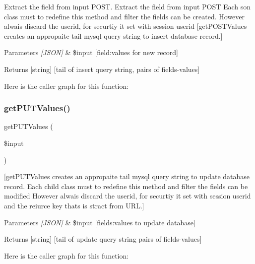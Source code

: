 Extract the field from input P\+O\+ST. Extract the field from input P\+O\+ST Each \textquotesingle{}son\textquotesingle{} class must to redefine this method and filter the fields can be created. However alwais discard the userid, for securtiy it set with session userid \mbox{[}get\+P\+O\+S\+T\+Values creates an appropaite tail mysql query string to insert database record.\mbox{]} 
\begin{DoxyParams}{Parameters}
{\em \mbox{[}\+J\+S\+O\+N\mbox{]}} & \$input \mbox{[}field\+:values for new record\mbox{]} \\
\hline
\end{DoxyParams}
\begin{DoxyReturn}{Returns}
\mbox{[}string\mbox{]} \mbox{[}tail of insert query string, pairs of fields-\/values\mbox{]} 
\end{DoxyReturn}
Here is the caller graph for this function\+:
\mbox{\label{class_resource_a6fa5ac14a003a305ce0c3aaa5612dc49}} 
\subsubsection{\texorpdfstring{get\+P\+U\+T\+Values()}{getPUTValues()}}
{\footnotesize\ttfamily get\+P\+U\+T\+Values (\begin{DoxyParamCaption}\item[{}]{\$input }\end{DoxyParamCaption})\hspace{0.3cm}{\ttfamily [protected]}}

\mbox{[}get\+P\+U\+T\+Values creates an appropaite tail mysql query string to update database record. Each child class must to redefine this method and filter the fields can be modified However alwais discard the userid, for securtiy it set with session userid and the reiurce key thats is stract from U\+RL.\mbox{]} 
\begin{DoxyParams}{Parameters}
{\em \mbox{[}\+J\+S\+O\+N\mbox{]}} & \$input \mbox{[}fields\+:values to update database\mbox{]} \\
\hline
\end{DoxyParams}
\begin{DoxyReturn}{Returns}
\mbox{[}string\mbox{]} \mbox{[}tail of update query string pairs of fields-\/values\mbox{]} 
\end{DoxyReturn}
Here is the caller graph for this function\+:
\mbox{\label{class_resource_ab1207918a97f72110966d1bbb95ffec0}} 
